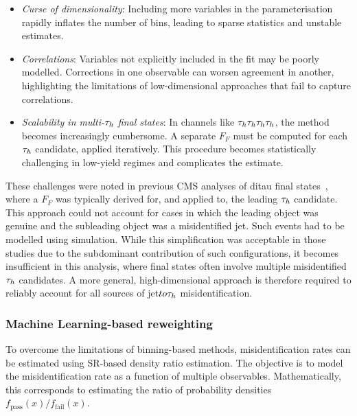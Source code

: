 \begin{itemize}
\item \textit{Curse of dimensionality}: Including more variables in the parameterisation rapidly inflates the number of bins, leading to sparse statistics and unstable estimates.

\item \textit{Correlations}: Variables not explicitly included in the fit may be poorly modelled. Corrections in one observable can worsen agreement in another, highlighting the limitations of low-dimensional approaches that fail to capture correlations.

\item \textit{Scalability in multi-$\tau_h$ final states}: In channels like $\tau_h \tau_h \tau_h \tau_h$, the method becomes increasingly cumbersome. A separate $F_F$ must be computed for each $\tau_h$ candidate, applied iteratively. This procedure becomes statistically challenging in low-yield regimes and complicates the estimate.
\end{itemize}

These challenges were noted in previous \ac{CMS} analyses of ditau final states~\cite{CMS:2022goy,Mb:2022rxu}, where a $F_F$ was typically derived for, and applied to, the leading $\tau_h$ candidate. This approach could not account for cases in which the leading object was genuine and the subleading object was a misidentified jet. Such events had to be modelled using simulation. While this simplification was acceptable in those studies due to the subdominant contribution of such configurations, it becomes insufficient in this analysis, where final states often involve multiple misidentified $\tau_h$ candidates. A more general, high-dimensional approach is therefore required to reliably account for all sources of jet$to\tau_h$ misidentification.


\subsubsection{Machine Learning-based reweighting}
\label{Section:Chapter6_FakeFactors_BDT}

To overcome the limitations of binning-based methods, misidentification rates can be estimated using \ac{SR}-based density ratio estimation. The objective is to model the misidentification rate as a function of multiple observables. Mathematically, this corresponds to estimating the ratio of probability densities $f_{\text{pass}}(x)/f_{\text{fail}}(x)$.


